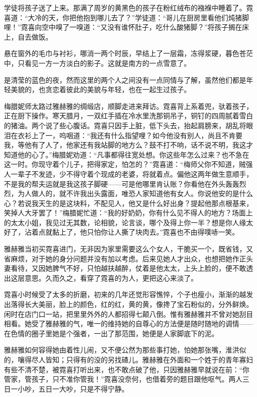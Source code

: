 \par 学徒将孩子送了上来。那满了周岁的黄黑色的孩子在粉红绒布的襁褓中睡着了。霓喜道：“大冷的天，你把他抱到哪儿去了？”学徒道：“哥儿在厨房里看他们炖猪脚哩！”霓喜向空中嗅了一嗅道：“又没有谁怀肚子，吃什么酸猪脚？”将孩子搁在床上，自去做饭。
\par 悬在窗外的毛巾与衬衫，哪消一两个时辰，早结上了一层霜，冻得浆硬，暮色苍茫中，只看见一方一方淡白的影子。这就是南方的一点雪意了。
\par 是清莹的蓝色的夜，然而这里的两个人之间没有一点同情与了解，虽然他们都是年轻美貌的，也贪恋着彼此的美貌与年轻，也在一起生过孩子。
\par 梅腊妮师太路过雅赫雅的绸缎店，顺脚走进来拜访。霓喜背上系着兜，驮着孩子，正在厨下操作。寒天腊月，一双红手插在冷水里洗那铜吊子，铜钉的四周腻着雪白的猪油。两个说了些心腹话。霓喜只因手上脏，低下头去，抬起肩膀来，胡乱将眼泪在衣衫上了一，呜咽道：“我还有什么指望哩？如今他没有别人，尚且不肯要我，等他有了人了，他家还有我站脚的地方么？鼓不打不响，话不说不明，我这才知道他的心了。”梅腊妮劝道：“凡事都得往宽处想。你这些年怎么过来？也不急在这一时。你现守着个儿子，把得家定，怕怎的？”霓喜道：“梅师父你不知道，贼强人一辈子不发迹，少不得守着个现成的老婆，将就着点。偏他这两年做生意顺手，不是我的帮夫运就是我这孩子脚硬——可是他哪里肯认账？你看他在外头轰轰烈烈，为人做人的，就不许我出头露面，唯恐人家知道他有女人。你说他安的是什么心？若说我天生的是这块料，不配见人，他又是什么好出身？提起他那点根基来，笑掉人大牙罢了！”梅腊妮忙道：“我的好奶奶，你有什么见不得人的地方？场面上的太太小姐，我见过无其数，论相貌，论言谈，哪个及得上你一半？想是你人缘太好了，沾着点就黏上了，他只怕你让人撕了块肉去。”霓喜也不由得噗哧一笑。
\par 雅赫雅当初买霓喜进门，无非因为家里需要这么个女人，干脆买一个，既省钱，又省麻烦，对于她的身分问题并没有加以考虑。后来见她人才出众，也想把她作正头妻看待，又因她脾气不好，只怕越扶越醉，仗着是他太太，上头上脸的，便不敢透出这层意思。久而久之，看穿了霓喜的为人，更把这心来淡了。
\par 霓喜小时候受了太多的折磨，初来的几年还觉形容憔悴，个子也瘦小，渐渐的越发出落得长大美丽，脸上的颜色，红的红，黄的黄，像搀了宝石粉似的，分外鲜焕。闲时在店门口一站，把里里外外的人都招得七颠八倒。惟有雅赫雅并不曾对她刮目相看。她受了雅赫雅的气，唯一的维持她的自尊心的方法便是随时随地的调情——在色情的圈子里她是个强者，一出了那范围，她便是人家脚底下的泥。
\par 雅赫雅如何容得她由着性儿闹，又不便公然为那些事打她，怕她那张嘴，淮洪似的，嚷得尽人皆知；只得有的没的另找碴儿。雅赫雅在外面和一个姓于的青年寡妇有些不清不楚，被霓喜打听出来，也不敢点破了他，只因雅赫雅早就说在前：“你管家，管孩子，只不准你管我！”霓喜没奈何，也借着旁的题目跟他呕气。两人三日一小吵，五日一大吵，只是不得宁静。
